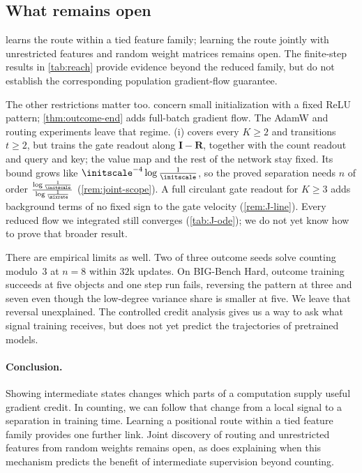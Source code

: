 \subsection{What remains open}
 learns the route within a tied feature family;
learning the route jointly with unrestricted features and random weight matrices remains open.
The finite-step results in \cref{tab:reach} provide evidence beyond the reduced family, but do
not establish the corresponding population gradient-flow guarantee.

The other restrictions matter too.  concern small initialization with a fixed ReLU pattern;
\cref{thm:outcome-end} adds full-batch gradient flow. The AdamW and routing experiments leave that regime. (i) covers
every $K\ge2$ and transitions $t\ge2$, but trains the gate readout along $\mathbf I-\mathbf R$, together with the count readout and
query and key; the value map and the rest of the network stay fixed. Its bound grows like $\initscale^{-4}\log\frac{1}{\initscale}$,
so the proved separation needs $n$ of order $\frac{\log\frac{1}{\initscale}}{\log\frac{1}{\mixrate}}$ (\cref{rem:joint-scope}). A full
circulant gate readout for $K\ge3$ adds background terms of no fixed sign to the gate velocity (\cref{rem:J-line}). Every reduced
flow we integrated still converges (\cref{tab:J-ode}); we do not yet know how to prove that broader result.

There are empirical limits as well. Two of three outcome seeds solve counting modulo~$3$ at $n=8$ within $32$k updates.
On BIG-Bench Hard, outcome training succeeds at five objects and one step run fails, reversing the pattern at three and seven
even though the low-degree variance share is smaller at five. We leave that reversal unexplained. The controlled credit analysis
gives us a way to ask what signal training receives, but does not yet predict the trajectories of pretrained models.

\paragraph{Conclusion.} Showing intermediate states changes which parts of a computation supply useful gradient credit. In counting,
we can follow that change from a local signal to a separation in training time. Learning a positional route within a tied feature family provides one further link.
Joint discovery of routing and unrestricted features from random weights remains open, as does
explaining when this mechanism predicts the benefit of intermediate supervision beyond counting.
